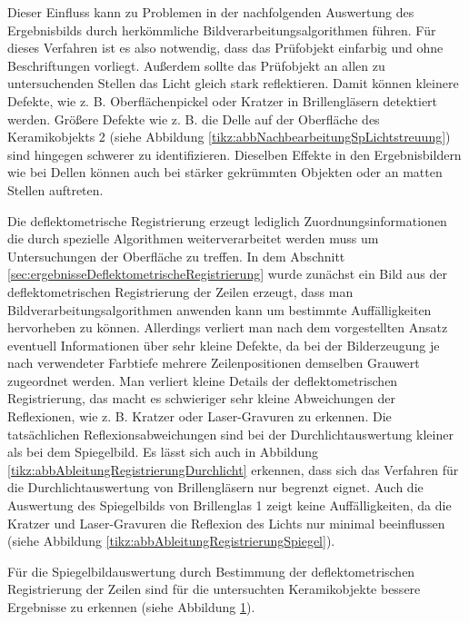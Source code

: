 \noindent
Dieser Einfluss kann zu Problemen in der nachfolgenden Auswertung des Ergebnisbilds durch herkömmliche Bildverarbeitungsalgorithmen führen.
Für dieses Verfahren ist es also notwendig, dass das Prüfobjekt einfarbig und ohne Beschriftungen vorliegt.
Außerdem sollte das Prüfobjekt an allen zu untersuchenden Stellen das Licht gleich stark reflektieren.
Damit können kleinere Defekte, wie z. B. Oberflächenpickel oder Kratzer in Brillengläsern detektiert werden.
Größere Defekte wie z. B. die Delle auf der Oberfläche des Keramikobjekts 2 (siehe Abbildung \ref{tikz:abbNachbearbeitungSpLichtstreuung}) sind hingegen schwerer zu identifizieren.
Dieselben Effekte in den Ergebnisbildern wie bei Dellen können auch bei stärker gekrümmten Objekten oder an matten Stellen auftreten.

\p
Die deflektometrische Registrierung erzeugt lediglich Zuordnungsinformationen die durch spezielle Algorithmen weiterverarbeitet werden muss um Untersuchungen der Oberfläche zu treffen.
In dem Abschnitt \ref{sec:ergebnisseDeflektometrischeRegistrierung} wurde zunächst ein Bild aus der  deflektometrischen Registrierung der Zeilen erzeugt, dass man Bildverarbeitungsalgorithmen anwenden kann um bestimmte Auffälligkeiten hervorheben zu können.
Allerdings verliert man nach dem vorgestellten Ansatz eventuell Informationen über sehr kleine Defekte, da bei der Bilderzeugung je nach verwendeter Farbtiefe mehrere Zeilenpositionen demselben Grauwert zugeordnet werden.
Man verliert kleine Details der deflektometrischen Registrierung, das macht es schwieriger sehr kleine Abweichungen der Reflexionen, wie z. B. Kratzer oder Laser-Gravuren zu erkennen.
Die tatsächlichen Reflexionsabweichungen sind bei der Durchlichtauswertung kleiner als bei dem Spiegelbild.
Es lässt sich auch in Abbildung \ref{tikz:abbAbleitungRegistrierungDurchlicht} erkennen, dass sich das Verfahren für die Durchlichtauswertung von Brillengläsern nur begrenzt eignet.
Auch die Auswertung des Spiegelbilds von Brillenglas 1 zeigt keine Auffälligkeiten, da die Kratzer und Laser-Gravuren die Reflexion des Lichts nur minimal beeinflussen (siehe Abbildung \ref{tikz:abbAbleitungRegistrierungSpiegel}).

\p
Für die Spiegelbildauswertung durch Bestimmung der deflektometrischen Registrierung der Zeilen sind für die untersuchten Keramikobjekte bessere Ergebnisse zu erkennen (siehe Abbildung \ref{tikz:abbErkennbareDefekteRegistrierung}).

{
	\begin{figure}[H]
		\centering
		
		\label{tikz:abbErkennbareDefekteRegistrierung}
	\end{figure}
}

